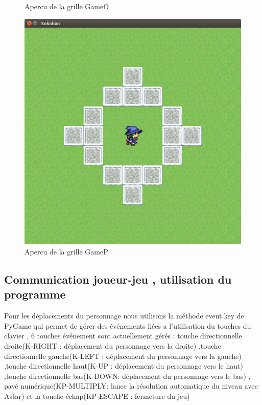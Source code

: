 \documentclass{article}
\begin{document}
\begin{figure}
\begin{center}
						\caption{Apercu de la grille GameO}
					\includegraphics[scale=0.25]{../Screenshots/07.png}
						\caption{Apercu de la grille GameP}
				\end{center}
				\end{figure}
				\newpage
		\subsection{Communication joueur-jeu , utilisation du programme}
		
			Pour les déplacements du personnage nous utilisons la méthode event.key de PyGame qui permet de gérer des événements liées a l'utilisation du touches du clavier , 6 touches événement sont actuellement gérés : touche directionnelle droite(K-RIGHT : déplacement du personnage vers la droite) ,touche directionnelle gauche(K-LEFT : déplacement du personnage vers la gauche) ,touche directionnelle haut(K-UP : déplacement du personnage vers le haut) ,touche directionnelle bas(K-DOWN: déplacement du personnage vers le bas) ,   pavé numérique(KP-MULTIPLY: lance la résolution automatique du niveau avec Astar) et la touche échap(KP-ESCAPE : fermeture du jeu)
\end{document}
